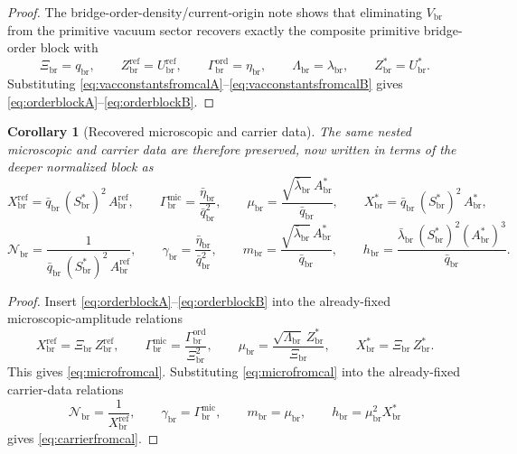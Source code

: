 \documentclass[11pt]{article}
\newcommand{\RespNorm}{\mathcal N_{\mathrm{br}}}
\newcommand{\RespFluxCoeff}{\gamma_{\mathrm{br}}}
\newcommand{\RespGap}{m_{\mathrm{br}}}
\newcommand{\RespBias}{h_{\mathrm{br}}}
\newcommand{\RespMicroEq}{X_{\mathrm{br}}^{\ast}}
\newcommand{\RespMicroRef}{X_{\mathrm{br}}^{\mathrm{ref}}}
\newcommand{\RespMicroFluxCoeff}{\Gamma_{\mathrm{br}}^{\mathrm{mic}}}
\newcommand{\RespMicroGap}{\mu_{\mathrm{br}}}
\newcommand{\RespOrderRef}{Z_{\mathrm{br}}^{\mathrm{ref}}}
\newcommand{\RespOrderEq}{Z_{\mathrm{br}}^{\ast}}
\newcommand{\RespOrderReadout}{\Xi_{\mathrm{br}}}
\newcommand{\RespOrderStiff}{\Gamma_{\mathrm{br}}^{\mathrm{ord}}}
\newcommand{\RespOrderQuartic}{\Lambda_{\mathrm{br}}}
\newcommand{\RespVacRef}{U_{\mathrm{br}}^{\mathrm{ref}}}
\newcommand{\RespVacEq}{U_{\mathrm{br}}^{\ast}}
\newcommand{\RespVacCarrier}{V_{\mathrm{br}}}
\newcommand{\RespVacReadout}{q_{\mathrm{br}}}
\newcommand{\RespVacWell}{\lambda_{\mathrm{br}}}
\newcommand{\RespVacIso}{\eta_{\mathrm{br}}}
\newcommand{\RespScaleEq}{S_{\mathrm{br}}^{\ast}}
\newcommand{\RespScaleAmpRef}{A_{\mathrm{br}}^{\mathrm{ref}}}
\newcommand{\RespScaleAmpEq}{A_{\mathrm{br}}^{\ast}}
\newcommand{\RespScaleReadout}{\bar q_{\mathrm{br}}}
\newcommand{\RespScaleWell}{\bar\lambda_{\mathrm{br}}}
\newcommand{\RespScaleIso}{\bar\eta_{\mathrm{br}}}
\newtheorem{corollary}{Corollary}
\begin{document}
\begin{proof}
The bridge-order-density/current-origin note shows that eliminating \(\RespVacCarrier\) from the primitive vacuum sector recovers exactly the composite primitive bridge-order block with
\[
\RespOrderReadout=\RespVacReadout,
\qquad
\RespOrderRef=\RespVacRef,
\qquad
\RespOrderStiff=\RespVacIso,
\qquad
\RespOrderQuartic=\RespVacWell,
\qquad
\RespOrderEq=\RespVacEq.
\]
Substituting \eqref{eq:vacconstantsfromcalA}--\eqref{eq:vacconstantsfromcalB} gives \eqref{eq:orderblockA}--\eqref{eq:orderblockB}.
\end{proof}

\begin{corollary}[Recovered microscopic and carrier data]
\label{cor:microcarrier}
The same nested microscopic and carrier data are therefore preserved, now written in terms of the deeper normalized block as
\begin{equation}
\RespMicroRef=\RespScaleReadout\,(\RespScaleEq)^2\,\RespScaleAmpRef,
\qquad
\RespMicroFluxCoeff=\frac{\RespScaleIso}{\RespScaleReadout^2},
\qquad
\RespMicroGap=\frac{\sqrt{\RespScaleWell}\,\RespScaleAmpEq}{\RespScaleReadout},
\qquad
\RespMicroEq=\RespScaleReadout\,(\RespScaleEq)^2\,\RespScaleAmpEq,
\label{eq:microfromcal}
\end{equation}
\begin{equation}
\RespNorm=\frac{1}{\RespScaleReadout\,(\RespScaleEq)^2\,\RespScaleAmpRef},
\qquad
\RespFluxCoeff=\frac{\RespScaleIso}{\RespScaleReadout^2},
\qquad
\RespGap=\frac{\sqrt{\RespScaleWell}\,\RespScaleAmpEq}{\RespScaleReadout},
\qquad
\RespBias=\frac{\RespScaleWell\,(\RespScaleEq)^2(\RespScaleAmpEq)^3}{\RespScaleReadout}.
\label{eq:carrierfromcal}
\end{equation}
\end{corollary}

\begin{proof}
Insert \eqref{eq:orderblockA}--\eqref{eq:orderblockB} into the already-fixed microscopic-amplitude relations
\[
\RespMicroRef=\RespOrderReadout\,\RespOrderRef,
\qquad
\RespMicroFluxCoeff=\frac{\RespOrderStiff}{\RespOrderReadout^2},
\qquad
\RespMicroGap=\frac{\sqrt{\RespOrderQuartic}\,\RespOrderEq}{\RespOrderReadout},
\qquad
\RespMicroEq=\RespOrderReadout\,\RespOrderEq.
\]
This gives \eqref{eq:microfromcal}. Substituting \eqref{eq:microfromcal} into the already-fixed carrier-data relations
\[
\RespNorm=\frac{1}{\RespMicroRef},
\qquad
\RespFluxCoeff=\RespMicroFluxCoeff,
\qquad
\RespGap=\RespMicroGap,
\qquad
\RespBias=\RespMicroGap^2\RespMicroEq
\]
gives \eqref{eq:carrierfromcal}.
\end{proof}
\end{document}
